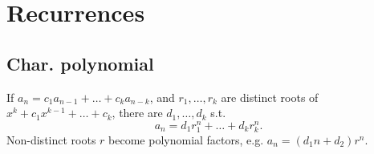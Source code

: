 \section{Recurrences}
	\subsection{Char. polynomial}
	If $a_n = c_1 a_{n-1} + \dots + c_k a_{n-k}$, and $r_1, \dots, r_k$ are distinct roots of $x^k + c_1 x^{k-1} + \dots + c_k$, there are $d_1, \dots, d_k$ s.t.
	\[a_n = d_1r_1^n + \dots + d_kr_k^n. \]
	Non-distinct roots $r$ become polynomial factors, e.g. $a_n = (d_1n + d_2)r^n$.
